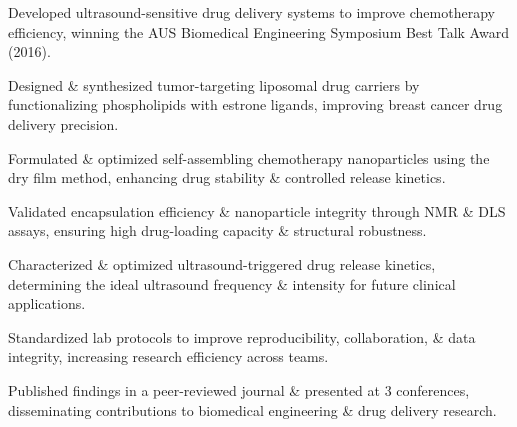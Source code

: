 \begin{tabitemize}
  \item Developed ultrasound-sensitive drug delivery systems to improve chemotherapy efficiency, winning the AUS Biomedical Engineering Symposium Best Talk Award (2016).
  \item Designed \& synthesized tumor-targeting liposomal drug carriers by functionalizing phospholipids with estrone ligands, improving breast cancer drug delivery precision.
  \item Formulated \& optimized self-assembling chemotherapy nanoparticles using the dry film method, enhancing drug stability \& controlled release kinetics.
  \item Validated encapsulation efficiency \& nanoparticle integrity through NMR \& DLS assays, ensuring high drug-loading capacity \& structural robustness.
  \item Characterized \& optimized ultrasound-triggered drug release kinetics, determining the ideal ultrasound frequency \& intensity for future clinical applications.
  \item Standardized lab protocols to improve reproducibility, collaboration, \& data integrity, increasing research efficiency across teams.
  \item Published findings in a peer-reviewed journal \& presented at 3 conferences, disseminating contributions to biomedical engineering \& drug delivery research.
\end{tabitemize}
\vspace{-1.6\baselineskip}
